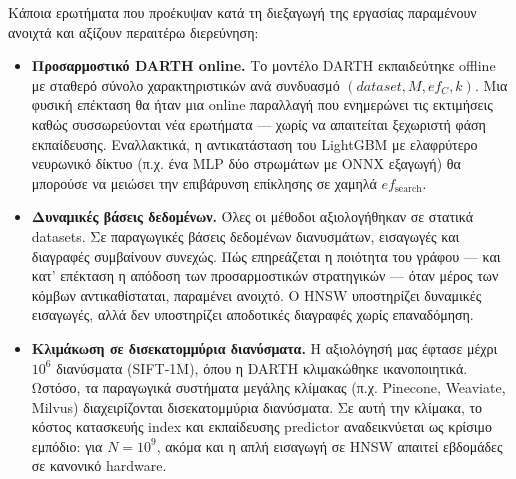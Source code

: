 \documentclass[12pt,a4paper]{article}
\begin{document}
Κάποια ερωτήματα που προέκυψαν κατά τη διεξαγωγή της εργασίας παραμένουν ανοιχτά και αξίζουν περαιτέρω διερεύνηση:

\begin{itemize}
    \item \textbf{Προσαρμοστικό DARTH online.} Το μοντέλο DARTH εκπαιδεύτηκε offline με σταθερό σύνολο χαρακτηριστικών ανά συνδυασμό $(dataset, M, ef_C, k)$. Μια φυσική επέκταση θα ήταν μια online παραλλαγή που ενημερώνει τις εκτιμήσεις καθώς συσσωρεύονται νέα ερωτήματα --- χωρίς να απαιτείται ξεχωριστή φάση εκπαίδευσης. Εναλλακτικά, η αντικατάσταση του LightGBM με ελαφρύτερο νευρωνικό δίκτυο (π.χ. ένα MLP δύο στρωμάτων με ONNX εξαγωγή) θα μπορούσε να μειώσει την επιβάρυνση επίκλησης σε χαμηλά $ef_{\text{search}}$.

    \item \textbf{Δυναμικές βάσεις δεδομένων.} Όλες οι μέθοδοι αξιολογήθηκαν σε στατικά datasets. Σε παραγωγικές βάσεις δεδομένων διανυσμάτων, εισαγωγές και διαγραφές συμβαίνουν συνεχώς. Πώς επηρεάζεται η ποιότητα του γράφου --- και κατ' επέκταση η απόδοση των προσαρμοστικών στρατηγικών --- όταν μέρος των κόμβων αντικαθίσταται, παραμένει ανοιχτό. Ο HNSW υποστηρίζει δυναμικές εισαγωγές, αλλά δεν υποστηρίζει αποδοτικές διαγραφές χωρίς επαναδόμηση.

    \item \textbf{Κλιμάκωση σε δισεκατομμύρια διανύσματα.} Η αξιολόγησή μας έφτασε μέχρι $10^6$ διανύσματα (SIFT-1M), όπου η DARTH κλιμακώθηκε ικανοποιητικά. Ωστόσο, τα παραγωγικά συστήματα μεγάλης κλίμακας (π.χ. Pinecone, Weaviate, Milvus) διαχειρίζονται δισεκατομμύρια διανύσματα. Σε αυτή την κλίμακα, το κόστος κατασκευής index και εκπαίδευσης predictor αναδεικνύεται ως κρίσιμο εμπόδιο: για $N = 10^9$, ακόμα και η απλή εισαγωγή σε HNSW απαιτεί εβδομάδες σε κανονικό hardware.


\end{itemize}
\end{document}
